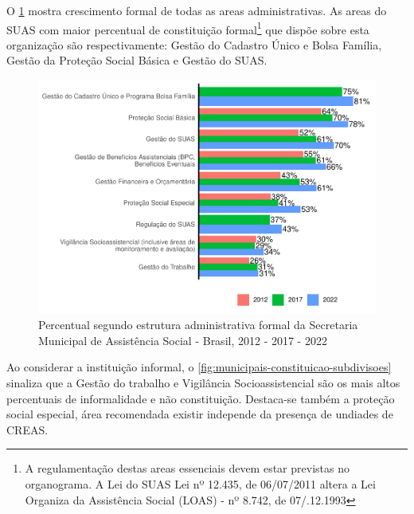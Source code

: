 \documentclass[
  brazilian]{report}
\begin{document}
O \cref{fig:munic_sub} mostra crescimento formal de todas as areas
administrativas. As areas do SUAS com maior percentual de constituição
formal\footnote{A regulamentação destas areas essenciais devem estar previstas no organograma. A Lei do SUAS Lei nº 12.435, de 06/07/2011 altera a Lei Organiza da Assistência Social (LOAS) - nº 8.742, de 07/.12.1993}
que dispõe sobre esta organização são respectivamente: Gestão do
Cadastro Único e Bolsa Família, Gestão da Proteção Social Básica e
Gestão do SUAS.

\begin{figure}
\includegraphics{Censo-SUAS-2022_files/figure-latex/munic_sub-1} \caption[Percentual segundo estrutura administrativa formal da Secretaria Municipal de Assistência Social - Brasil, 2012 - 2017 - 2022]{Percentual segundo estrutura administrativa formal da Secretaria Municipal de Assistência Social - Brasil, 2012 - 2017 - 2022}\label{fig:munic_sub}
\end{figure}

Ao considerar a instituição informal, o
\cref{fig:municipais-constituicao-subdivisoes} sinaliza que a Gestão do
trabalho e Vigilância Socioassistencial são os mais altos percentuais de
informalidade e não constituição. Destaca-se também a proteção social
especial, área recomendada existir independe da presença de undiades de
CREAS.
\end{document}
